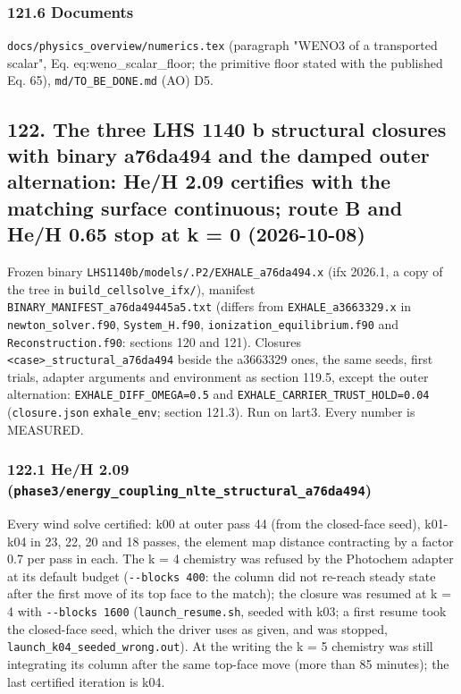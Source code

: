 \documentclass[english,a4paper]{my_memo}
\begin{document}
\subsubsection{121.6 Documents}\label{1216-documents}

\texttt{docs/physics\_overview/numerics.tex} (paragraph "WENO3 of a transported
scalar", Eq. eq:weno\_scalar\_floor; the primitive floor stated with the
published Eq. 65), \texttt{md/TO\_BE\_DONE.md} (AO) D5.

\subsection{122. The three LHS 1140 b structural closures with binary a76da494 and the damped outer alternation: He/H 2.09 certifies with the matching surface continuous; route B and He/H 0.65 stop at k = 0 (2026-10-08)}\label{122-the-three-lhs-1140-b-structural-closures-with-binary-a76da494-and-the-damped-outer-alternation-heh-209-certifies-with-the-matching-surface-continuous-route-b-and-heh-065-stop-at-k--0-2026-10-08}

Frozen binary \texttt{LHS1140b/models/.P2/EXHALE\_a76da494.x} (ifx 2026.1, a copy of
the tree in \texttt{build\_cellsolve\_ifx/}), manifest
\texttt{BINARY\_MANIFEST\_a76da49445a5.txt} (differs from \texttt{EXHALE\_a3663329.x} in
\texttt{newton\_solver.f90}, \texttt{System\_H.f90}, \texttt{ionization\_equilibrium.f90} and
\texttt{Reconstruction.f90}: sections 120 and 121). Closures
\texttt{\textless{}case\textgreater{}\_structural\_a76da494} beside the a3663329 ones, the same seeds, first
trials, adapter arguments and environment as section 119.5, except the outer
alternation: \texttt{EXHALE\_DIFF\_OMEGA=0.5} and \texttt{EXHALE\_CARRIER\_TRUST\_HOLD=0.04}
(\texttt{closure.json} \texttt{exhale\_env}; section 121.3). Run on lart3. Every number is
MEASURED.

\subsubsection{\texorpdfstring{122.1 He/H 2.09 (\texttt{phase3/energy\_coupling\_nlte\_structural\_a76da494})}{122.1 He/H 2.09 (phase3/energy\_coupling\_nlte\_structural\_a76da494)}}\label{1221-heh-209-phase3energy_coupling_nlte_structural_a76da494}

Every wind solve certified: k00 at outer pass 44 (from the closed-face seed),
k01-k04 in 23, 22, 20 and 18 passes, the element map distance contracting by
a factor 0.7 per pass in each. The k = 4 chemistry was refused by the
Photochem adapter at its default budget (\texttt{-\/-blocks\ 400}: the column did not
re-reach steady state after the first move of its top face to the match);
the closure was resumed at k = 4 with \texttt{-\/-blocks\ 1600} (\texttt{launch\_resume.sh},
seeded with k03; a first resume took the closed-face seed, which the driver
uses as given, and was stopped, \texttt{launch\_k04\_seeded\_wrong.out}). At the
writing the k = 5 chemistry was still integrating its column after the same
top-face move (more than 85 minutes); the last certified iteration is k04.
\end{document}
